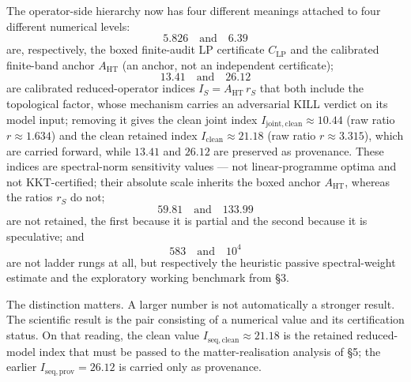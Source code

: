 \documentclass[11pt,a4paper]{article}
\begin{document}
The operator-side hierarchy now has four different meanings attached to four different numerical levels:
\[
5.826
\quad
\text{and}
\quad
6.39
\]
are, respectively, the boxed finite-audit LP certificate $C_{\mathrm{LP}}$ and the calibrated finite-band anchor $A_{\mathrm{HT}}$ (an anchor, not an independent certificate);
\[
13.41
\quad
\text{and}
\quad
26.12
\]
are calibrated reduced-operator indices $I_{S}=A_{\mathrm{HT}}\,r_{S}$ that both include the topological factor, whose mechanism carries an adversarial KILL verdict on its model input; removing it gives the clean joint index $I_{\mathrm{joint,clean}}\approx10.44$ (raw ratio $r\approx1.634$) and the clean retained index $I_{\mathrm{clean}}\approx21.18$ (raw ratio $r\approx3.315$), which are carried forward, while $13.41$ and $26.12$ are preserved as provenance. These indices are spectral-norm sensitivity values --- not linear-programme optima and not KKT-certified; their absolute scale inherits the boxed anchor $A_{\mathrm{HT}}$, whereas the ratios $r_{S}$ do not;
\[
59.81
\quad
\text{and}
\quad
133.99
\]
are not retained, the first because it is partial and the second because it is speculative;
and
\[
583
\quad
\text{and}
\quad
10^{4}
\]
are not ladder rungs at all, but respectively the heuristic passive spectral-weight estimate and the exploratory working benchmark from §3.

The distinction matters. A larger number is not automatically a stronger result. The scientific result is the pair consisting of a numerical value and its certification status. On that reading, the clean value $I_{\mathrm{seq,clean}}\approx21.18$ is the retained reduced-model index that must be passed to the matter-realisation analysis of §5; the earlier $I_{\mathrm{seq,prov}}=26.12$ is carried only as provenance.
\end{document}
